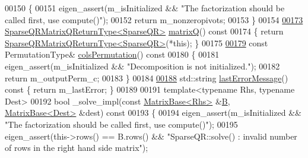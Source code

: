 \begin{DoxyCode}
00150 \textcolor{keyword}{    }\{
00151       eigen\_assert(m\_isInitialized && \textcolor{stringliteral}{"The factorization should be called first, use compute()"});
00152       \textcolor{keywordflow}{return} m\_nonzeropivots; 
00153     \}
00154     
\hyperlink{group___sparse_q_r___module_ae1cc0a836c177d4f42600f8639354be1}{00173}     \hyperlink{struct_eigen_1_1_sparse_q_r_matrix_q_return_type}{SparseQRMatrixQReturnType<SparseQR>} 
      \hyperlink{group___sparse_q_r___module_ae1cc0a836c177d4f42600f8639354be1}{matrixQ}()\textcolor{keyword}{ const }
00174 \textcolor{keyword}{    }\{ \textcolor{keywordflow}{return} \hyperlink{struct_eigen_1_1_sparse_q_r_matrix_q_return_type}{SparseQRMatrixQReturnType<SparseQR>}(*this); \}
00175     
\hyperlink{group___sparse_q_r___module_a140930ebbf89dfd57a173761716db38f}{00179}     \textcolor{keyword}{const} PermutationType& \hyperlink{group___sparse_q_r___module_a140930ebbf89dfd57a173761716db38f}{colsPermutation}()\textcolor{keyword}{ const}
00180 \textcolor{keyword}{    }\{ 
00181       eigen\_assert(m\_isInitialized && \textcolor{stringliteral}{"Decomposition is not initialized."});
00182       \textcolor{keywordflow}{return} m\_outputPerm\_c;
00183     \}
00184     
\hyperlink{group___sparse_q_r___module_a1222e59649d77125d91f1368cf293c63}{00188}     std::string \hyperlink{group___sparse_q_r___module_a1222e59649d77125d91f1368cf293c63}{lastErrorMessage}()\textcolor{keyword}{ const }\{ \textcolor{keywordflow}{return} m\_lastError; \}
00189     
00191     \textcolor{keyword}{template}<\textcolor{keyword}{typename} Rhs, \textcolor{keyword}{typename} Dest>
00192     \textcolor{keywordtype}{bool} \_solve\_impl(\textcolor{keyword}{const} \hyperlink{group___core___module_class_eigen_1_1_matrix_base}{MatrixBase<Rhs>} &\hyperlink{group___core___module_class_eigen_1_1_matrix}{B}, \hyperlink{group___core___module_class_eigen_1_1_matrix_base}{MatrixBase<Dest>} &dest)\textcolor{keyword}{
       const}
00193 \textcolor{keyword}{    }\{
00194       eigen\_assert(m\_isInitialized && \textcolor{stringliteral}{"The factorization should be called first, use compute()"});
00195       eigen\_assert(this->rows() == B.rows() && \textcolor{stringliteral}{"SparseQR::solve() : invalid number of rows in the right
       hand side matrix"});

\end{DoxyCode}
